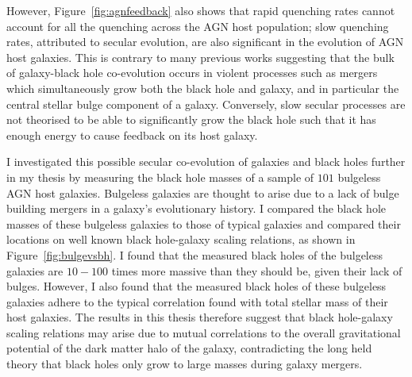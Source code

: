 \documentclass[12pt]{article}
\begin{document}
However, Figure~\ref{fig:agnfeedback} also shows that rapid quenching rates cannot account for all the quenching across the AGN host population; slow quenching rates, attributed to secular evolution, are also significant in the evolution of AGN host galaxies. This is contrary to many previous works suggesting that the bulk of galaxy-black hole co-evolution occurs in violent processes such as mergers which simultaneously grow both the black hole and galaxy, and in particular the central stellar bulge component of a galaxy. Conversely, slow secular processes are not theorised to be able to significantly grow the black hole such that it has enough energy to cause feedback on its host galaxy.

I investigated this possible secular co-evolution of galaxies and black holes further in my thesis by measuring the black hole masses of a sample of $101$ bulgeless AGN host galaxies. Bulgeless galaxies are thought to arise due to a lack of bulge building mergers in a galaxy's evolutionary history. I compared the black hole masses of these bulgeless galaxies to those of typical galaxies and compared their locations on well known black hole-galaxy scaling relations, as shown in Figure~\ref{fig:bulgevsbh}. I found that the measured black holes of the bulgeless galaxies are $10-100$ times more massive than they should be, given their lack of bulges. However, I also found that the measured black holes of these bulgeless galaxies adhere to the typical correlation found with total stellar mass of their host galaxies. The results in this thesis therefore suggest that black hole-galaxy scaling relations may arise due to mutual correlations to the overall gravitational potential of the dark matter halo of the galaxy, contradicting the long held theory that black holes only grow to large masses during galaxy mergers. 
\end{document}

